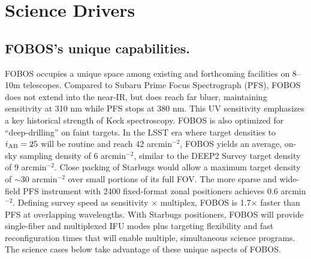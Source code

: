 \documentclass[oneside,11pt]{amsart}
\begin{document}



\section{Science Drivers}
\label{sec:goals}

\subsection{FOBOS's unique capabilities.} FOBOS occupies a unique
space among existing and forthcoming facilities on 8--10m telescopes.
Compared to Subaru Prime Focus Spectrograph (PFS), FOBOS does not
extend into the near-IR, but does reach far bluer, maintaining
sensitivity at 310 nm while PFS stops at 380 nm. This UV sensitivity
emphasizes a key historical strength of Keck spectroscopy. FOBOS is
also optimized for ``deep-drilling'' on faint targets. In the LSST
era where target densities to $i_{\rm AB} = 25$ will be routine and
reach 42 arcmin$^{-2}$, FOBOS yields an average, on-sky sampling
density of 6 arcmin$^{-2}$, similar to the DEEP2 Survey target
density of 9 arcmin$^{-2}$. Close packing of Starbugs would allow a
maximum target density of $\sim$30 arcmin$^{-2}$ over small portions
of its full FOV. The more sparse and wide-field PFS instrument with
2400 fixed-format zonal positioners achieves 0.6 arcmin$^{-2}$.
Defining survey speed as sensitivity $\times$ multiplex, FOBOS is
1.7$\times$ faster than PFS at overlapping wavelengths. With Starbugs
positioners, FOBOS will provide single-fiber and multiplexed IFU
modes plus targeting flexibility and fast reconfiguration times that
will enable multiple, simultaneous science programs. The science
cases below take advantage of these unique aspects of FOBOS.







\end{document}
